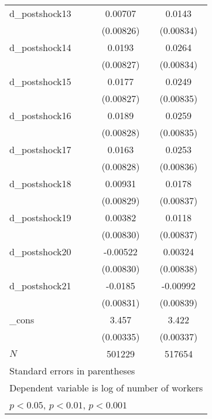 {\begin{tabular}{l*{2}{c}}
d\_postshock13&  0.00707         &   0.0143         \\
          &(0.00826)         &(0.00834)         \\
d\_postshock14&   0.0193\sym{*}  &   0.0264\sym{**} \\
          &(0.00827)         &(0.00834)         \\
d\_postshock15&   0.0177\sym{*}  &   0.0249\sym{**} \\
          &(0.00827)         &(0.00835)         \\
d\_postshock16&   0.0189\sym{*}  &   0.0259\sym{**} \\
          &(0.00828)         &(0.00835)         \\
d\_postshock17&   0.0163\sym{*}  &   0.0253\sym{**} \\
          &(0.00828)         &(0.00836)         \\
d\_postshock18&  0.00931         &   0.0178\sym{*}  \\
          &(0.00829)         &(0.00837)         \\
d\_postshock19&  0.00382         &   0.0118         \\
          &(0.00830)         &(0.00837)         \\
d\_postshock20& -0.00522         &  0.00324         \\
          &(0.00830)         &(0.00838)         \\
d\_postshock21&  -0.0185\sym{*}  & -0.00992         \\
          &(0.00831)         &(0.00839)         \\
\_cons    &    3.457\sym{***}&    3.422\sym{***}\\
          &(0.00335)         &(0.00337)         \\
\hline
\(N\)     &   501229         &   517654         \\
\hline\hline
\multicolumn{3}{l}{\footnotesize Standard errors in parentheses}\\
\multicolumn{3}{l}{\footnotesize Dependent variable is log of number of workers}\\
\multicolumn{3}{l}{\footnotesize \sym{*} \(p<0.05\), \sym{**} \(p<0.01\), \sym{***} \(p<0.001\)}\\
\end{tabular}
}
